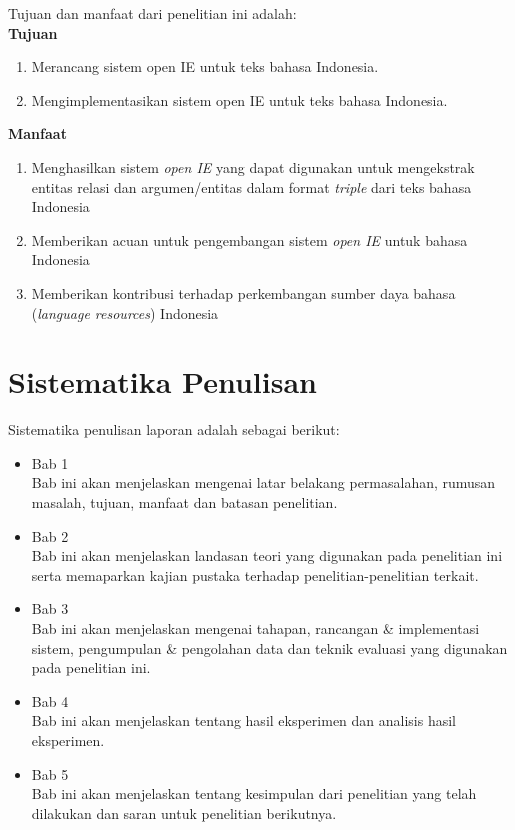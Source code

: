 Tujuan dan manfaat dari penelitian ini adalah:\\

\textbf{Tujuan}

\begin{enumerate}
\item Merancang sistem open IE untuk teks bahasa Indonesia.

\item Mengimplementasikan sistem open IE untuk teks bahasa Indonesia.
\end{enumerate}

\textbf{Manfaat}

\begin{enumerate}
\item Menghasilkan sistem \textit{open IE} yang dapat digunakan untuk mengekstrak entitas relasi dan argumen/entitas dalam format \textit{triple} dari teks bahasa Indonesia

\item Memberikan acuan untuk pengembangan sistem \textit{open IE} untuk bahasa Indonesia

\item Memberikan kontribusi terhadap perkembangan sumber daya bahasa (\textit{language resources}) Indonesia
\end{enumerate}

\section{Sistematika Penulisan}
Sistematika penulisan laporan adalah sebagai berikut:
\begin{itemize}
	\item Bab 1 \babSatu \\
	Bab ini akan menjelaskan mengenai latar belakang permasalahan, rumusan
masalah, tujuan, manfaat dan batasan penelitian.
	
	\item Bab 2 \babDua \\
	Bab ini akan menjelaskan landasan teori yang digunakan pada penelitian ini serta memaparkan kajian pustaka terhadap penelitian-penelitian terkait.
	
	\item Bab 3 \babTiga \\
	Bab ini akan menjelaskan mengenai tahapan, rancangan \& implementasi sistem, pengumpulan \& pengolahan data dan teknik evaluasi yang digunakan pada penelitian ini.
	
	\item Bab 4 \babEmpat \\
	Bab ini akan menjelaskan tentang hasil eksperimen dan analisis hasil
eksperimen.
	
	\item Bab 5 \babLima \\
	Bab ini akan menjelaskan tentang kesimpulan dari penelitian yang telah
dilakukan dan saran untuk penelitian berikutnya.
\end{itemize}

